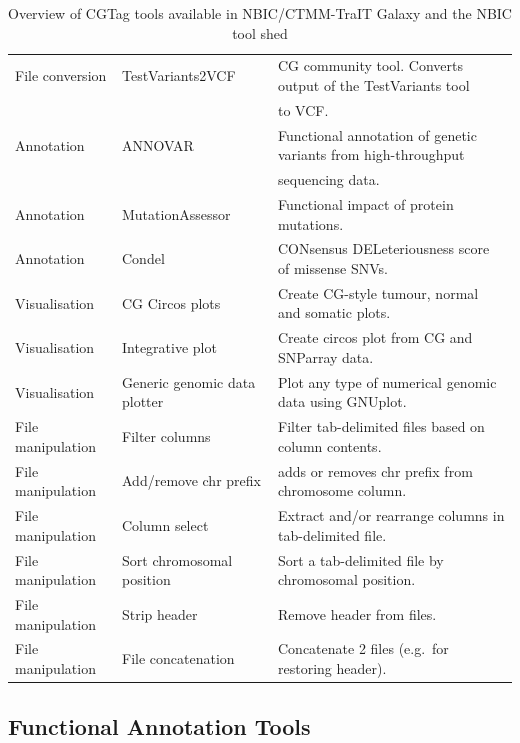 \begin{table}[t!]
\begin{tabular}{l|l|l}
File conversion   & TestVariants2VCF      & CG community tool. Converts output of the TestVariants tool \\
                  &                       & to VCF.\\
Annotation        & ANNOVAR               & Functional annotation of genetic variants from high-throughput \\
                  &                       & sequencing data.\\
Annotation        & MutationAssessor      & Functional impact of protein mutations.\\
Annotation        & Condel                & CONsensus DELeteriousness score of missense SNVs.\\
Visualisation     & CG Circos plots       & Create CG-style tumour, normal and somatic plots.\\
Visualisation     & Integrative plot      & Create circos plot from CG and SNParray data.\\
Visualisation     & Generic genomic data plotter & Plot any type of numerical genomic data using GNUplot.\\
File manipulation & Filter columns        & Filter tab-delimited files based on column contents.\\
File manipulation & Add/remove chr prefix & adds or removes chr prefix from chromosome column.\\
File manipulation & Column select         & Extract and/or rearrange columns in tab-delimited file.\\
File manipulation & Sort chromosomal position & Sort a tab-delimited file by chromosomal position.\\
File manipulation & Strip header          & Remove header from files.\\
File manipulation & File concatenation    & Concatenate 2 files (e.g.\ for restoring header).\\

\end{tabular}
\caption{Overview of CGTag tools available in NBIC/CTMM-TraIT Galaxy and the NBIC tool shed}\label{table:tools}
\end{table}
\normalsize


\subsection*{Functional Annotation Tools}

